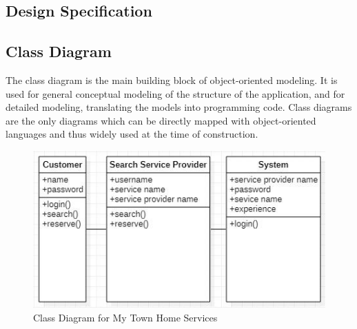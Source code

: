 \documentclass[12pt,a4paper]{report}
\begin{document}
\begin{titlepage}
{\section{ Design Specification }
\vspace{0.5cm}
\subsection{Class Diagram}
The class diagram is the main building block of object-oriented modeling. It is used for general conceptual modeling of the structure of the application, and for detailed modeling, translating the models into programming code. Class diagrams are the only diagrams which can be directly mapped with object-oriented languages and thus widely used at the time of construction.\\
\vspace{1.0cm}
\begin{figure}[h!]
	\begin{center}
		 \includegraphics[width=\linewidth]{clas.jpeg}
	\end{center}
	\caption{Class Diagram for My Town Home Services}
\end{figure}
}
\end{titlepage}
\end{document}
